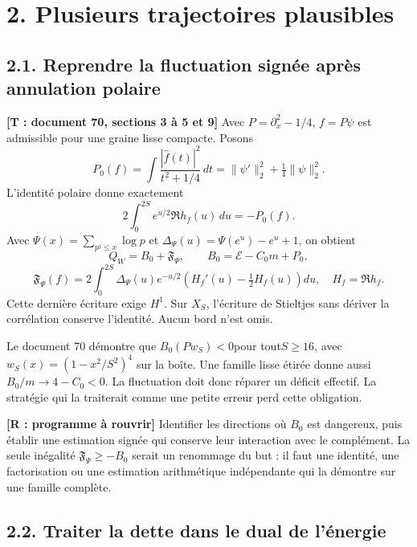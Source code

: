 \documentclass[
  10pt,
  a4paper,
]{article}
\begin{document}
\hypertarget{plusieurs-trajectoires-plausibles}{%
\section{2. Plusieurs trajectoires
plausibles}\label{plusieurs-trajectoires-plausibles}}

\hypertarget{reprendre-la-fluctuation-signuxe9e-apruxe8s-annulation-polaire}{%
\subsection{2.1. Reprendre la fluctuation signée après annulation
polaire}\label{reprendre-la-fluctuation-signuxe9e-apruxe8s-annulation-polaire}}

\textbf{{[}T : document 70, sections 3 à 5 et 9{]}} Avec
\(P=\partial_x^2-1/4\), \(f=P\psi\) est admissible pour une graine lisse
compacte. Posons \[
P_0(f)=\int\frac{|\widehat f(t)|^2}{t^2+1/4}\,dt
=\|\psi'\|_2^2+\tfrac14\|\psi\|_2^2.
\] L'identité polaire donne exactement \[
2\int_0^{2S}e^{u/2}\Re h_f(u)\,du=-P_0(f).
\] Avec \(\Psi(x)=\sum_{p^j\le x}\log p\) et
\(\Delta_\Psi(u)=\Psi(e^u)-e^u+1\), on obtient \[
\boxed{Q_W=B_0+\mathfrak F_\Psi},\qquad
B_0=\mathcal E-C_0m+P_0,
\] \[
\mathfrak F_\Psi(f)=2\int_0^{2S}\Delta_\Psi(u)e^{-u/2}
\left(H_f'(u)-\tfrac12H_f(u)\right)du,\quad H_f=\Re h_f.
\] Cette dernière écriture exige \(H^1\). Sur \(X_S\), l'écriture de
Stieltjes sans dériver la corrélation conserve l'identité. Aucun bord
n'est omis.

Le document 70 démontre que \(B_0(Pw_S)<0\)pour tout\(S\ge16\), avec
\(w_S(x)=(1-x^2/S^2)^4\) sur la boîte. Une famille lisse étirée donne
aussi \(B_0/m\to4-C_0<0\). La fluctuation doit donc réparer un déficit
effectif. La stratégie qui la traiterait comme une petite erreur perd
cette obligation.

\textbf{{[}R : programme à rouvrir{]}} Identifier les directions où
\(B_0\) est dangereux, puis établir une estimation signée qui conserve
leur interaction avec le complément. La seule inégalité
\(\mathfrak F_\Psi\ge-B_0\) serait un renommage du but : il faut une
identité, une factorisation ou une estimation arithmétique indépendante
qui la démontre sur une famille complète.

\hypertarget{traiter-la-dette-dans-le-dual-de-luxe9nergie}{%
\subsection{2.2. Traiter la dette dans le dual de
l'énergie}\label{traiter-la-dette-dans-le-dual-de-luxe9nergie}}
\end{document}
